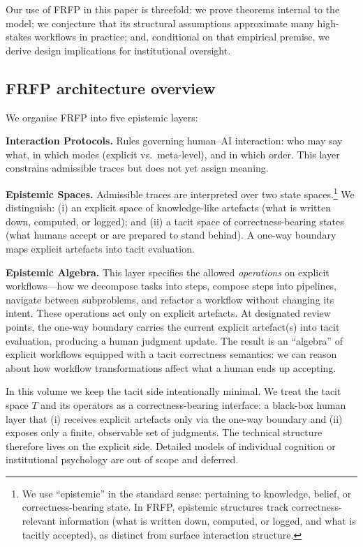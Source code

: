 \documentclass[preprints,accept]{Definitions/mdpi}
\theoremstyle{definition}
\begin{document}
Our use of FRFP in this paper is threefold: we prove theorems internal to the model; we conjecture that its structural assumptions approximate many high-stakes workflows in practice; and, conditional on that empirical premise, we derive design implications for institutional oversight.

\subsection{FRFP architecture overview}
\label{sec:frfp-architecture-overview}
We organise FRFP into five epistemic layers:

\textbf{Interaction Protocols.}
Rules governing human--AI interaction: who may say what, in which modes (explicit vs.\ meta-level), and in which order. This layer constrains admissible traces but does not yet assign meaning.

\textbf{Epistemic Spaces.}
Admissible traces are interpreted over two state spaces.\footnote{We use ``epistemic'' in the standard sense: pertaining to knowledge, belief, or correctness-bearing state. In FRFP, epistemic structures track correctness-relevant information (what is written down, computed, or logged, and what is tacitly accepted), as distinct from surface interaction structure.}
We distinguish: (i) an explicit space of knowledge-like artefacts (what is written down, computed, or logged); and (ii) a tacit space of correctness-bearing states (what humans accept or are prepared to stand behind). A one-way boundary maps explicit artefacts into tacit evaluation.

\textbf{Epistemic Algebra.}
This layer specifies the allowed \emph{operations} on explicit workflows---how we decompose tasks into steps, compose steps into pipelines, navigate between subproblems, and refactor a workflow without changing its intent. These operations act only on explicit artefacts. At designated review points, the one-way boundary carries the current explicit artefact(s) into tacit evaluation, producing a human judgment update. The result is an ``algebra'' of explicit workflows equipped with a tacit correctness semantics: we can reason about how workflow transformations affect what a human ends up accepting.

In this volume we keep the tacit side intentionally minimal. We treat the tacit space $T$ and its operators as a correctness-bearing interface: a black-box human layer that (i) receives explicit artefacts only via the one-way boundary and (ii) exposes only a finite, observable set of judgments. The technical structure therefore lives on the explicit side. Detailed models of individual cognition or institutional psychology are out of scope and deferred.
\end{document}
